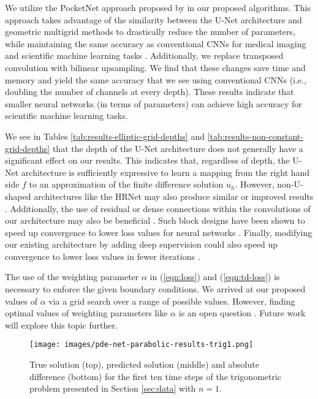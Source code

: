 \documentclass[preprint,12pt]{elsarticle}
\begin{document}
We utilize the PocketNet approach proposed by \cite{celaya2022pocketnet} in our proposed algorithms. This approach takes advantage of the similarity between the U-Net architecture and geometric multigrid methods to drastically reduce the number of parameters, while maintaining the same accuracy as conventional CNNs for medical imaging and scientific machine learning tasks \cite{celaya2022pocketnet, mgnet, celaya2023joint}. Additionally, we replace transposed convolution with bilinear upsampling. We find that these changes save time and memory and yield the same accuracy that we see using conventional CNNs (i.e., doubling the number of channels at every depth). These results indicate that smaller neural networks (in terms of parameters) can achieve high accuracy for scientific machine learning tasks.

We see in Tables \ref{tab:results-elliptic-grid-depths} and \ref{tab:results-non-constant-grid-depths} that the depth of the U-Net architecture does not generally have a significant effect on our results. This indicates that, regardless of depth, the U-Net architecture is sufficiently expressive to learn a mapping from the right hand side $f$ to an approximation of the finite difference solution $u_h$. However, non-U-shaped architectures like the HRNet may also produce similar or improved results \cite{hrnet}. Additionally, the use of residual or dense connections within the convolutions of our architecture may also be beneficial \cite{resnet, densenet}. Such block designs have been shown to speed up convergence to lower loss values for neural networks \cite{li2018visualizing}. Finally, modifying our existing architecture by adding deep supervision could also speed up convergence to lower loss values in fewer iterations \cite{pmlr-v38-lee15a, li2022comprehensive}.

The use of the weighting parameter $\alpha$ in (\ref{eqn:loss}) and (\ref{eqn:td-loss}) is necessary to enforce the given boundary conditions. We arrived at our proposed values of $\alpha$ via a grid search over a range of possible values. However, finding optimal values of weighting parameters like $\alpha$ is an open question \cite{cuomo2022scientific}. Future work will explore this topic further.

\begin{figure}[ht!]
    \centering
    \texttt{[image: images/pde-net-parabolic-results-trig1.png]}
    \caption{True solution (top), predicted solution (middle) and absolute difference (bottom) for the first ten time steps of the trigonometric problem presented in Section \ref{sec:data} with $n=1$.}
    \label{fig:parabolic-trig-2}
\end{figure}
\end{document}
